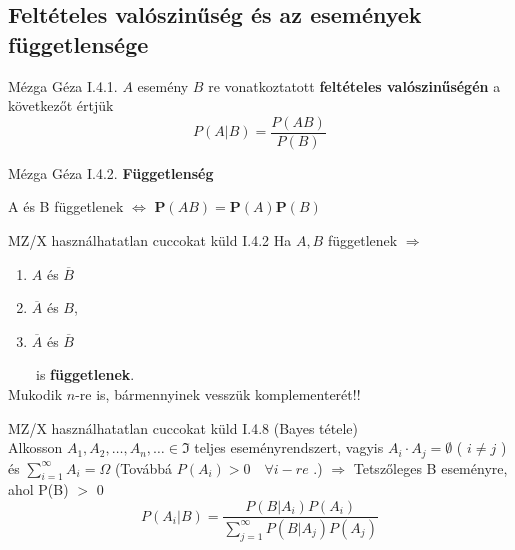 \subsection{Feltételes valószinűség és az események függetlensége}
 	\begin{definicio}{Mézga Géza}
   I.4.1. $A$ esemény $B$ re vonatkoztatott \textbf{feltételes valószinűségén} a következőt értjük \\[5pt] $$P(A|B) = \dfrac{P(AB)}{P(B)}$$
\end{definicio}
  \begin{definicio}{Mézga Géza}
	I.4.2. \textbf{Függetlenség}
	\begin{center}
		A és B függetlenek $\Longleftrightarrow$ $\mathbf{P}(AB) = \mathbf{P}(A) \mathbf{P}(B)$
	\end{center}
\end{definicio}

  \begin{tetel}{MZ/X használhatatlan cuccokat küld}
	I.4.2 Ha $A,B$ függetlenek $\Longrightarrow$
	\begin{enumerate}
		\item $A$ és $\overline{B}$
		\item $\overline{A}$ és $B$,
		\item $\overline{A}$ és $\overline{B}$
	\end{enumerate}
	$\quad\quad$is \textbf{függetlenek}.\\[3pt]
	\small Mukodik $n$-re is, bármennyinek vesszük komplementerét!! \\[5pt]
\end{tetel}

	\normalsize
  \begin{tetel}{MZ/X használhatatlan cuccokat küld}
	I.4.8 (Bayes tétele) \\[5pt]
	Alkosson $A_1,A_2,\ldots,A_n,\ldots \in \Im$ teljes eseményrendszert, vagyis $A_i \cdot A_j = \emptyset$ ( $i \neq j$ ) és $\sum\limits_{i=1}^\infty A_i = \Omega$ (Továbbá $P(A_i) >0 \quad\forall i-re$ .) $\Longrightarrow$
	Tetszőleges B eseményre, ahol P(B) $>$ 0 \quad \\$$P(A_i|B) = \dfrac{P(B|A_i)P(A_i)}{\sum\limits_{j=1}^\infty P(B|A_j)P(A_j)}$$
\end{tetel}
